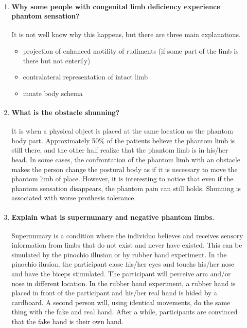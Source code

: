 \documentclass[12pt,article,oneside,a4paper]{memoir}
\begin{document}
\begin{enumerate}
\item \paragraph{Why some people with congenital limb deficiency experience
phantom sensation?}
It is not well know why this happens, but there are three main explanations.
\begin{itemize}
\item projection of enhanced motility of rudiments (if some part of the limb is
there but not enterily)
\item contralateral representation of intact limb
\item innate body schema
\end{itemize}

\item \paragraph{What is the obstacle shunning?}
It is when a physical object is placed at the same location as the phantom body
part. Approximately 50\% of the patients believe the phantom limb is still
there, and the other half realize that the phantom limb is in his/her head. In
some cases, the confrontation of the phantom limb with an obstacle makes the
person change the postural body as if it is necessary to move the phantom limb
of place. However, it is interesting to notice that even if the phantom
sensation disappears, the phantom pain can still holds.
Shunning is associated with worse prothesis tolerance.

\item \paragraph{Explain what is supernumary and negative phantom limbs.}
Supernumary is a condition where the individuo believes and receives sensory
information from limbs that do not exist and never have existed. This can be
simulated by the pinochio illusion or by rubber hand experiment. In the
pinochio ilusion, the participant close his/her eyes and touchs his/her nose
and have the biceps stimulated. The participant will perceive arm and/or nose
in different location. In the rubber hand experiment, a rubber hand is placed
in front of the participant and his/her real hand is hided by a cardboard. A
second person will, using identical movements, do the same thing with the fake
and real hand. After a while, participants are convinced that the fake hand is
their own hand.


\end{enumerate}
\end{document}
